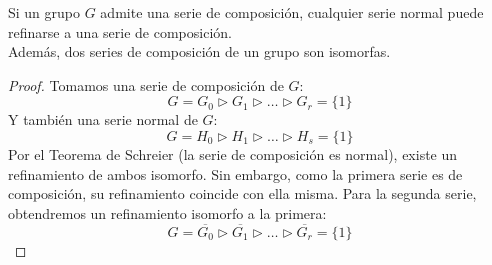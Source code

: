 \begin{teo}
    Si un grupo $G$ admite una serie de composición, cualquier serie normal puede refinarse a una serie de composición.\\

    \noindent
    Además, dos series de composición de un grupo son isomorfas.
    \begin{proof}
        Tomamos una serie de composición de $G$:
        \begin{equation*}
            G= G_0 \rhd G_1 \rhd \ldots \rhd G_r = \{1\}
        \end{equation*}
        Y también una serie normal de $G$:
        \begin{equation*}
            G=H_0 \rhd H_1 \rhd \ldots \rhd H_s = \{1\}
        \end{equation*}
        Por el Teorema de Schreier (la serie de composición es normal), existe un refinamiento de ambos isomorfo. Sin embargo, como la primera serie es de composición, su refinamiento coincide con ella misma. Para la segunda serie, obtendremos un refinamiento isomorfo a la primera:
        \begin{equation*}
            G = \overline{G_0} \rhd \overline{G_1} \rhd \ldots \rhd \overline{G_r} = \{1\}
        \end{equation*}
    \end{proof}
\end{teo}
